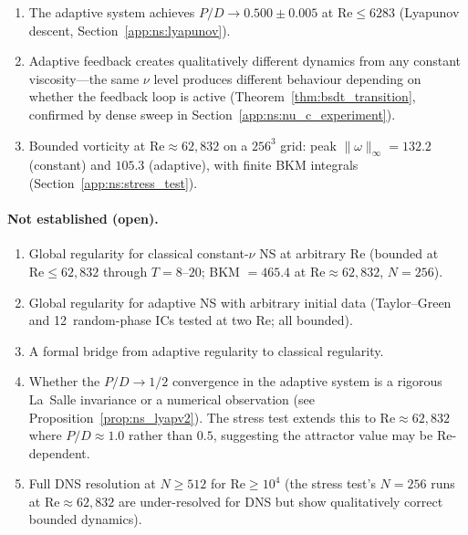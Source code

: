 \begin{enumerate}
  $\gamma^*$ saturates within $O(1)$ time units at every
  tested Re.
\item The adaptive system achieves $P/D \to 0.500 \pm 0.005$
  at $\mathrm{Re} \le 6283$
  (Lyapunov descent, Section~\ref{app:ns:lyapunov}).
\item Adaptive feedback creates qualitatively different
  dynamics from any constant viscosity---the same
  $\nu$ level produces different behaviour depending
  on whether the feedback loop is active
  (Theorem~\ref{thm:bsdt_transition}, confirmed by
  dense sweep in Section~\ref{app:ns:nu_c_experiment}).
\item Bounded vorticity at $\mathrm{Re}\approx 62{,}832$
  on a $256^3$ grid: peak $\|\omega\|_\infty = 132.2$
  (constant) and $105.3$ (adaptive), with finite BKM
  integrals (Section~\ref{app:ns:stress_test}).
\end{enumerate}

\paragraph{Not established (open).}
\begin{enumerate}
\item Global regularity for classical constant-$\nu$ NS
  at arbitrary Re (bounded at $\mathrm{Re} \le 62{,}832$
  through $T = 8$--$20$; BKM $= 465.4$
  at $\mathrm{Re} \approx 62{,}832$, $N=256$).
\item Global regularity for adaptive NS with arbitrary initial
  data (Taylor--Green and 12~random-phase ICs tested at
  two Re; all bounded).
\item A formal bridge from adaptive regularity to classical
  regularity.
\item Whether the $P/D \to 1/2$ convergence in the adaptive
  system is a rigorous La~Salle invariance or a numerical
  observation (see Proposition~\ref{prop:ns_lyapv2}).
  The stress test extends this to $\mathrm{Re}\approx 62{,}832$
  where $P/D \approx 1.0$ rather than $0.5$, suggesting the
  attractor value may be Re-dependent.
\item Full DNS resolution at $N \ge 512$ for
  $\mathrm{Re} \ge 10^4$ (the stress test's $N=256$ runs
  at $\mathrm{Re}\approx 62{,}832$ are under-resolved for
  DNS but show qualitatively correct bounded dynamics).
\end{enumerate}

